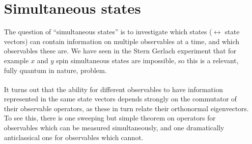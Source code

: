 \section{Simultaneous states}
The question of ``simultaneous states'' is to investigate which states ($\leftrightarrow$ state vectors) can contain information on multiple observables at a time, and which observables these are. We have seen in the Stern Gerlach experiment that for example $x$ and $y$ spin simultaneous states are impossible, so this is a relevant, fully quantum in nature, problem.
\\\\
It turns out that the ability for different observables to have information represented in the same state vectors depends strongly on the commutator of their observable operators, as these in turn relate their orthonormal eigenvectors. To see this, there is one sweeping but simple theorem on operators for observables which can be measured simultaneously, and one dramatically anticlassical one for observables which cannot.
